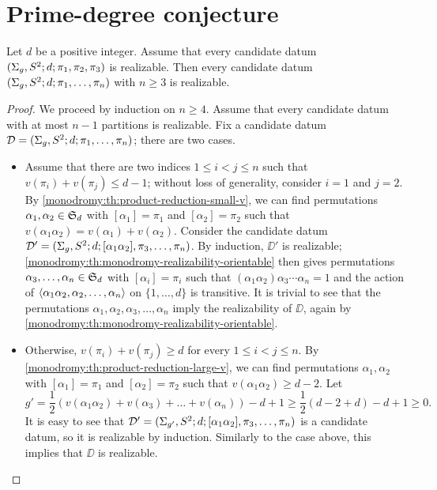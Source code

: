 \section{Prime-degree conjecture}
\begin{proposition}
Let $d$ be a positive integer. Assume that every candidate datum $(\Sigma_{g},S^2{};d;\pi_1,\pi_2,\pi_3)$ is realizable. Then every candidate datum $(\Sigma_{g},S^2{};d;\pi_1,\ldots,\pi_n)$ with $n\ge 3$ is realizable.
\end{proposition}
\begin{proof}
We proceed by induction on $n\ge 4$. Assume that every candidate datum with at most $n-1$ partitions is realizable. Fix a candidate datum $\mathcal{D}=(\Sigma_{g},S^2{};d;\pi_1,\ldots,\pi_{n})$; there are two cases.
\begin{itemize}
\item Assume that there are two indices $1\le i<j\le n$ such that $v(\pi_i)+v(\pi_j)\le d-1$; without loss of generality, consider $i=1$ and $j=2$. By \cref{monodromy:th:product-reduction-small-v}, we can find permutations $\alpha_1,\alpha_2\in\symgroup[d]$ with $[\alpha_1]=\pi_1$ and $[\alpha_2]=\pi_2$ such that $v(\alpha_1\alpha_2)=v(\alpha_1)+v(\alpha_2)$. Consider the candidate datum $\mathcal{D}'=(\Sigma_{g},S^2{};d;[\alpha_1\alpha_2],\pi_3,\ldots,\pi_n)$. By induction, $\DD'$ is realizable; \cref{monodromy:th:monodromy-realizability-orientable} then gives permutations $\alpha_3,\ldots,\alpha_n\in\symgroup[d]$ with $[\alpha_i]=\pi_i$ such that $(\alpha_1\alpha_2)\alpha_3\cdots\alpha_n=1$ and the action of $\left\langle\alpha_1\alpha_2,\alpha_2,\ldots,\alpha_n\right\rangle$ on $\{1,\ldots,d\}$ is transitive. It is trivial to see that the permutations $\alpha_1,\alpha_2,\alpha_3,\ldots,\alpha_n$ imply the realizability of $\DD$, again by \cref{monodromy:th:monodromy-realizability-orientable}.
\item Otherwise, $v(\pi_i)+v(\pi_j)\ge d$ for every $1\le i<j\le n$. By \cref{monodromy:th:product-reduction-large-v}, we can find permutations $\alpha_1,\alpha_2$ with $[\alpha_1]=\pi_1$ and $[\alpha_2]=\pi_2$ such that $v(\alpha_1\alpha_2)\ge d-2$. Let
\[
g'=\frac{1}{2}(v(\alpha_1\alpha_2)+v(\alpha_3)+\ldots+v(\alpha_n))-d+1\ge\frac{1}{2}(d-2+d)-d+1\ge 0.
\]
It is easy to see that $\mathcal{D}'=(\Sigma_{g'},S^2{};d;[\alpha_1\alpha_2],\pi_3,\ldots,\pi_n)$ is a candidate datum, so it is realizable by induction. Similarly to the case above, this implies that $\DD$ is realizable.
\end{itemize}
\end{proof}